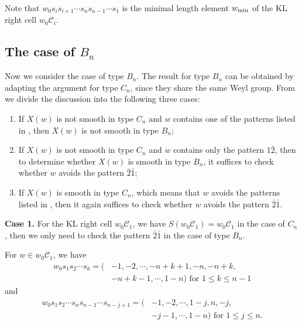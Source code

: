 \documentclass[11pt, reqno]{amsart}
\theoremstyle{definition}
\numberwithin{equation}{section}
\begin{document}
Note that $w_0s_is_{i+1}\cdots s_ns_{n-1}\cdots s_{1}$ is the minimal length element $w_{\rm min} $
 of the KL right cell $w_0\mathcal{C}_i$.
 
\subsection{The case of $B_n$}
Now we consider the case of type $B_n$. The result for type $B_n$ can be obtained by adapting the argument for type $C_n$, since they share the same Weyl group. From \cite[Thm. 4.2 and Thm. 6.1]{Bi-98} we divide the discussion into the following three cases:
\begin{enumerate}
    \item[(i)] If $X(w)$ is not smooth in type $C_n$ and $w$ contains one of the patterns listed in \cite[Thm. 4.2]{Bi-98}, then $X(w)$ is not smooth in type $B_n$;

    \item[(ii)] If $X(w)$ is not smooth in type $C_n$ and $w$ contains only the pattern $1\bar{2}$, then to determine whether $X(w)$ is smooth in type $B_n$, it suffices to check whether $w$ avoids the pattern $\bar{2}\bar{1}$;

    \item[(iii)] If $X(w)$ is smooth in type $C_n$, which means that $w$ avoids the patterns listed in \cite[Thm. 4.2 and Thm. 6.1]{Bi-98}, then it again suffices to check whether $w$ avoids the pattern $\bar{2}\bar{1}$.
\end{enumerate}



{\bf Case 1.} For the KL right cell $ w_0\mathcal{C}_1$, we have $S( w_0\mathcal{C}_1)= w_0\mathcal{C}_1$ in the case of $C_n$, then we only need to check the pattern $\bar{2}\bar{1}$ in the case of type $B_n$.

For $w\in w_0\mathcal{C}_1$, we have 
\begin{align*}
    w_0s_1s_2\cdots s_k=(&-1,-2,\cdots,-n+k+1,-n,-n+k,\\&-n+k-1,\cdots,1-n)\text{~for~} 1\leq k\leq n-1
\end{align*}
 and 
 \begin{align*}
     w_0s_1s_2\cdots s_ns_{n-1}\cdots s_{n-j+1}=(&-1,-2,\cdots,1-j,n,-j,\\&-j-1,\cdots,1-n)\text{~for~}1\leq j\leq n.
 \end{align*}
\end{document}

